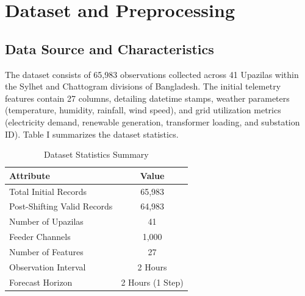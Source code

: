 \section{Dataset and Preprocessing}
\subsection{Data Source and Characteristics}
The dataset consists of 65,983 observations collected across 41 Upazilas within the Sylhet and Chattogram divisions of Bangladesh. The initial telemetry features contain 27 columns, detailing datetime stamps, weather parameters (temperature, humidity, rainfall, wind speed), and grid utilization metrics (electricity demand, renewable generation, transformer loading, and substation ID). Table I summarizes the dataset statistics.

\begin{table}[htbp]
\caption{Dataset Statistics Summary}
\centering
\begin{tabular}{lc}
\toprule
\textbf{Attribute} & \textbf{Value} \\
\midrule
Total Initial Records & 65,983 \\
Post-Shifting Valid Records & 64,983 \\
Number of Upazilas & 41 \\
Feeder Channels & 1,000 \\
Number of Features & 27 \\
Observation Interval & 2 Hours \\
Forecast Horizon & 2 Hours (1 Step) \\
\bottomrule
\end{tabular}
\label{tab:stats}
\end{table}

